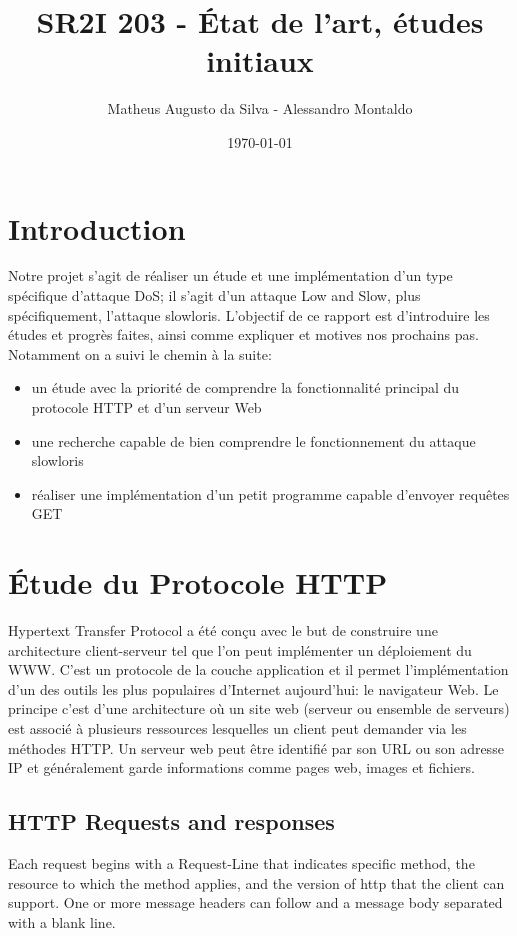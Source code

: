\documentclass{article}
\author{Matheus Augusto da Silva - Alessandro Montaldo}
\title{\textbf{SR2I 203 - État de l'art, études initiaux}}
\date{\today}
\begin{document}
\maketitle
\section{Introduction}
Notre projet s'agit de réaliser un étude et une implémentation d'un type spécifique d'attaque DoS; il s'agit d'un attaque Low and Slow, plus spécifiquement,
l'attaque slowloris. L'objectif de ce rapport est d'introduire les études et progrès faites, ainsi comme expliquer et motives nos prochains pas.
Notamment on a suivi le chemin à la suite:

\begin{itemize}
	\item un étude avec la priorité de comprendre la fonctionnalité principal du protocole HTTP et d'un serveur Web
	\item une recherche capable de bien comprendre le fonctionnement du attaque slowloris
	\item réaliser une implémentation d'un petit programme capable d'envoyer requêtes GET
\end{itemize}

\section{Étude du Protocole HTTP}
Hypertext Transfer Protocol a été conçu avec le but de construire une architecture client-serveur tel que l'on peut implémenter un déploiement du WWW. C'est un protocole de la couche application et il permet l'implémentation d'un des outils les plus populaires d'Internet aujourd'hui: le navigateur Web.
Le principe c'est d'une architecture où un site web (serveur ou ensemble de serveurs) est associé à plusieurs ressources lesquelles un client peut demander via les méthodes HTTP. Un serveur web peut être identifié par son URL ou son adresse IP et généralement garde informations comme pages web, images et fichiers.

\subsection{HTTP Requests and responses}
Each request begins with a Request-Line that indicates specific method, the resource to which the method applies, and the version of http that the client can support. One or more message headers can follow and a message body separated with a blank line. \\
\end{document}
